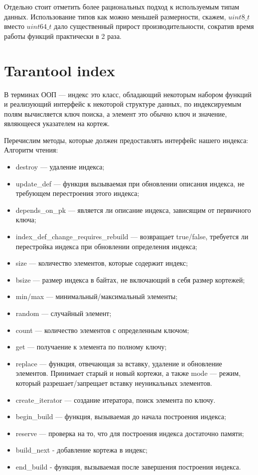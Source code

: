 Отдельно стоит отметить более рациональных подход к используемым типам данных.
Использование типов как можно меньшей размерности, скажем,
$uint8\_t$ вместо $uint64\_t$ дало существенный прирост производительности, сократив время работы функций практически в 2 раза.

\section{Tarantool index}
В терминах ООП --- индекс это класс,
обладающий некоторым набором функций и реализующий интерфейс
к некоторой структуре данных,
по индексируемым полям вычисляется ключ поиска,
а элемент это обычно ключ и значение, являющееся указателем на кортеж.

Перечислим методы, которые должен предоставлять интерфейс нашего индекса:
Алгоритм чтения:
\begin{itemize}
	\item destroy --- удаление индекса;
	\item update\_def --- функция вызываемая при обновлении описания индекса, не требующем перестроения этого индекса;
	\item depends\_on\_pk --- является ли описание индекса, зависящим от первичного ключа;
	\item index\_def\_change\_requires\_rebuild --- возвращает true/false, требуется ли перестройка индекса при обновлении определения индекса;
	\item size --- количество элементов, которые содержит индекс;
	\item bsize --- размер индекса в байтах, не включающий в себя размер кортежей;
	\item min/max --- минимальный/максимальный элементы;
	\item random --- случайный элемент;
	\item count --- количество элементов с определенным ключом;
	\item get --- получаение к элемента по полному ключу;
	\item replace --- функция, отвечающая за вставку, удаление и обновление элементов. Принимает старый и новый кортежи, а также mode --- режим, который разрешает/запрещает вставку неуникальных элементов.
	\item create\_iterator --- создание итератора, поиск элемента по ключу.
	\item begin\_build --- функция, вызываемая до начала построения индекса;
	\item reserve --- проверка на то, что для построения индекса достаточно памяти;
	\item build\_next - добавление кортежа в индекс;
	\item end\_build - функция, вызываемая после завершения построения индекса.
\end{itemize}

